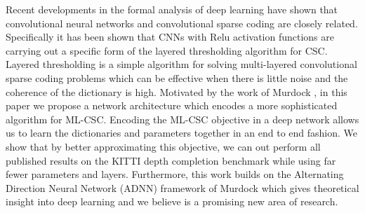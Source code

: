 
Recent developments in the formal analysis of deep learning have shown that convolutional neural networks and convolutional sparse coding are closely related. Specifically it has been shown that CNNs with Relu activation functions are carrying out a specific form of the layered thresholding algorithm for CSC. Layered thresholding is a simple algorithm for solving multi-layered convolutional sparse coding problems which can be effective when there is little noise and the coherence of the dictionary is high. Motivated by the work of Murdock \etal, in this paper we propose a network architecture which encodes a more sophisticated algorithm for ML-CSC. Encoding the ML-CSC objective in a deep network allows us to learn the dictionaries and parameters together in an end to end fashion. We show that by better approximating this objective, we can out perform all published results on the KITTI depth completion benchmark while using far fewer parameters and layers. Furthermore, this work builds on the Alternating Direction Neural Network (ADNN) framework of Murdock \etal which gives theoretical insight into deep learning and we believe is a promising new area of research.


